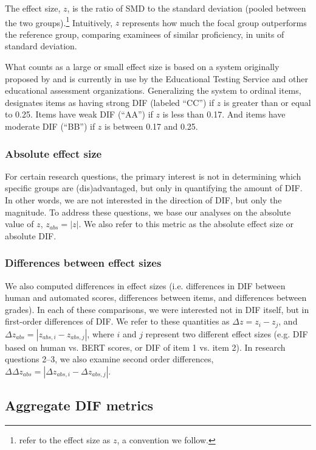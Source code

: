 \documentclass [PhD] {uclathes}
\begin{document}
The effect size, $z$, is the ratio of SMD to the standard deviation (pooled between the two groups).\footnote{\cite{ormerod2022automated} refer to the effect size as $z$, a convention we follow.} Intuitively, $z$ represents how much the focal group outperforms the reference group, comparing examinees of similar proficiency, in units of standard deviation.

What counts as a large or small effect size is based on a system originally proposed by \citet{zwick1993assessment} and is currently in use by the Educational Testing Service and other educational assessment organizations. Generalizing the system to ordinal items, \citet[][p. 150]{naep2001} designates items as having strong DIF (labeled “CC”) if $z$ is greater than or equal to 0.25. Items have weak DIF (“AA”) if $z$ is less than 0.17. And items have moderate DIF (“BB”) if $z$ is between 0.17 and 0.25.

\subsubsection{Absolute effect size}

For certain research questions, the primary interest is not in determining which specific groups are (dis)advantaged, but only in quantifying the amount of DIF. In other words, we are not interested in the direction of DIF, but only the magnitude. To address these questions, we base our analyses on the absolute value of $z$, $z_{abs} = |z|$. We also refer to this metric as the absolute effect size or absolute DIF.

\subsubsection{Differences between effect sizes}

We also computed differences in effect sizes (i.e. differences in DIF between human and automated scores, differences between items, and differences between grades). In each of these comparisons, we were interested not in DIF itself, but in first-order differences of DIF. We refer to these quantities as $\Delta z = z_i - z_j$, and $\Delta z_{abs} = |z_{abs,i} - z_{abs,j}|$, where $i$ and $j$ represent two different effect sizes (e.g. DIF based on human vs. BERT scores, or DIF of item 1 vs. item 2). In research questions 2–3, we also examine second order differences, $\Delta \Delta z_{abs} = |\Delta z_{abs,i} - \Delta z_{abs,j}|$.

\subsection{Aggregate DIF metrics}
\end{document}
